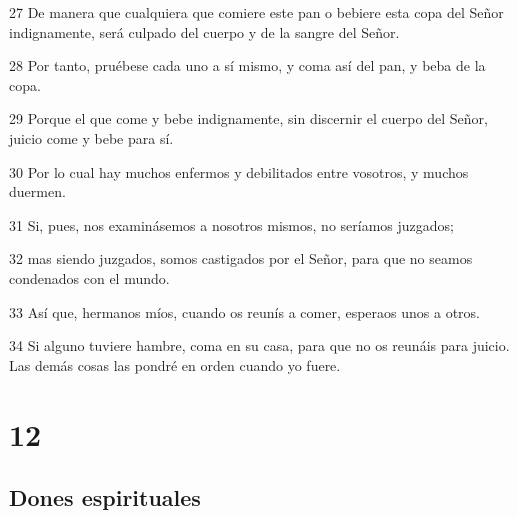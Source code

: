 \par 27 De manera que cualquiera que comiere este pan o bebiere esta copa del Señor indignamente, será culpado del cuerpo y de la sangre del Señor.
\par 28 Por tanto, pruébese cada uno a sí mismo, y coma así del pan, y beba de la copa.
\par 29 Porque el que come y bebe indignamente, sin discernir el cuerpo del Señor, juicio come y bebe para sí.
\par 30 Por lo cual hay muchos enfermos y debilitados entre vosotros, y muchos duermen.
\par 31 Si, pues, nos examinásemos a nosotros mismos, no seríamos juzgados;
\par 32 mas siendo juzgados, somos castigados por el Señor, para que no seamos condenados con el mundo.
\par 33 Así que, hermanos míos, cuando os reunís a comer, esperaos unos a otros.
\par 34 Si alguno tuviere hambre, coma en su casa, para que no os reunáis para juicio. Las demás cosas las pondré en orden cuando yo fuere.

\chapter{12}

\section*{Dones espirituales}

